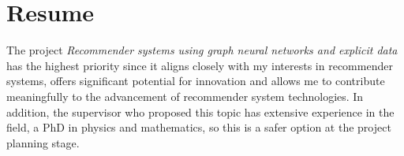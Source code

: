 \documentclass[12pt]{article}
\begin{document}
\section{Resume}
The project \emph{Recommender systems using graph neural networks and explicit data} has the highest priority since it aligns closely with my
interests in recommender systems, offers significant potential for innovation and allows me to contribute meaningfully to the advancement of
recommender system technologies. In addition, the supervisor who proposed this topic has extensive experience in the field, a PhD in physics and
mathematics, so this is a safer option at the project planning stage.
\end{document}
